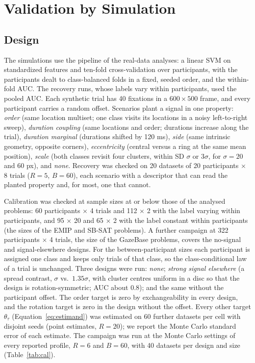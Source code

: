 \section{Validation by Simulation}\label{sec:sim}
\subsection{Design}
The simulations use the pipeline of the real-data analyses: a linear SVM on standardized features and ten-fold cross-validation over participants, with the participants dealt to class-balanced folds in a fixed, seeded order, and the within-fold AUC. The recovery runs, whose labels vary within participants, used the pooled AUC. Each synthetic trial has 40 fixations in a $600\times500$ frame, and every participant carries a random offset. Scenarios plant a signal in one property: \emph{order} (same location multiset; one class visits its locations in a noisy left-to-right sweep), \emph{duration coupling} (same locations and order; durations increase along the trial), \emph{duration marginal} (durations shifted by 120 ms), \emph{side} (same intrinsic geometry, opposite corners), \emph{eccentricity} (central versus a ring at the same mean position), \emph{scale} (both classes revisit four clusters, within SD $\sigma$ or $3\sigma$, for $\sigma = 20$ and 60 px), and \emph{none}. Recovery was checked on 20 datasets of 20 participants $\times$ 8 trials ($R = 5$, $B = 60$), each scenario with a descriptor that can read the planted property and, for most, one that cannot.

Calibration was checked at sample sizes at or below those of the analysed problems: 60 participants $\times$ 4 trials and 112 $\times$ 2 with the label varying within participants, and 95 $\times$ 20 and 65 $\times$ 2 with the label constant within participants (the sizes of the EMIP and SB-SAT problems). A further campaign at 322 participants $\times$ 4 trials, the size of the GazeBase problems, covers the no-signal and signal-elsewhere designs. For the between-participant sizes each participant is assigned one class and keeps only trials of that class, so the class-conditional law of a trial is unchanged. Three designs were run: \emph{none}; \emph{strong signal elsewhere} (a spread contrast, $\sigma$ vs.\ $1.35\sigma$, with cluster centres uniform in a disc so that the design is rotation-symmetric; AUC about 0.8); and the same without the participant offset. The order target is zero by exchangeability in every design, and the rotation target is zero in the design without the offset. Every other target $\theta_\tau$ (Equation~\ref{eq:estimand}) was estimated on 60 further datasets per cell with disjoint seeds (point estimates, $R = 20$); we report the Monte Carlo standard error of each estimate. The campaign was run at the Monte Carlo settings of every reported profile, $R = 6$ and $B = 60$, with 40 datasets per design and size (Table~\ref{tab:cal}).


